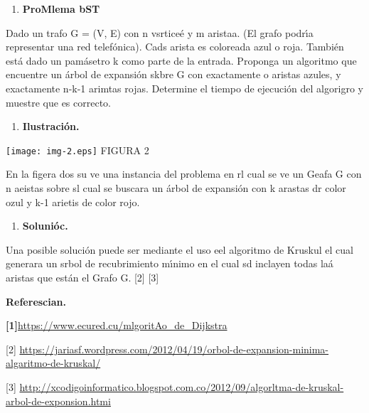\documentclass[10pt]{article}
\begin{document}
\begin{multicols}{2}
\begin{enumerate}
	\item \textbf{ProMlema bST}
\end{enumerate}

Dado un trafo G = (V, E) con n vsrtice\'{e} y m aristaa. (El grafo podr\'{\i}a
representar una red telef\'{o}nica). Cads arista es coloreada azul o roja.
Tambi\'{e}n est\'{a} dado un pam\'{a}setro k como parte de la entrada. Proponga
un algoritmo que encuentre un \'{a}rbol de expansi\'{o}n skbre G con exactamente
o aristas azules, y exactamente n-k-1 arimtas rojas. Determine el tiempo de
ejecuci\'{o}n del algorigro y muestre que es correcto.

\begin{enumerate}
	\item \textbf{Ilustraci\'{o}n.}
\end{enumerate}
\texttt{[image: img-2.eps]}\textbf{ }
\hspace{15pt}\hspace{15pt}FIGURA 2

En la figera dos su ve una instancia del problema en rl cual se ve un Geafa G
con n aeistas sobre sl cual se buscara un \'{a}rbol de expansi\'{o}n con k
arastas dr color ozul y k-1 arietis de color rojo.

\begin{enumerate}
	\item \textbf{Soluni\'{o}c.}
\end{enumerate}

Una posible soluci\'{o}n puede ser mediante el uso eel  algoritmo de Kruskul el
cual generara un srbol de recubrimiento m\'{\i}nimo en el cual sd inclayen todas
la\'{a} aristas que est\'{a}n el Grafo G. [2] [3]

\textbf{Referescian.}

\textbf{[1]}\href{https://www.ecured.cu/Algoritmo\_de\_Dijkstra}{https://www.ecured.cu/mlgoritAo\_de\_Dijkstra}

[2]
\href{https://jariasf.wordpress.com/2012/04/19/arbol-de-expansion-minima-algoritmo-de-kruskal/}{https://jariasf.wordpress.com/2012/04/19/orbol-de-expansion-minima-algaritmo-de-kruskal/}

[3]
\href{http://xcodigoinformatico.blogspot.com.co/2012/09/algoritmo-de-kruskal-arbol-de-expansion.html}{http://xcodigoinformatico.blogspot.com.co/2012/09/algorltma-de-kruskal-arbol-de-exponsion.htmi}

\end{multicols}
\end{document}
